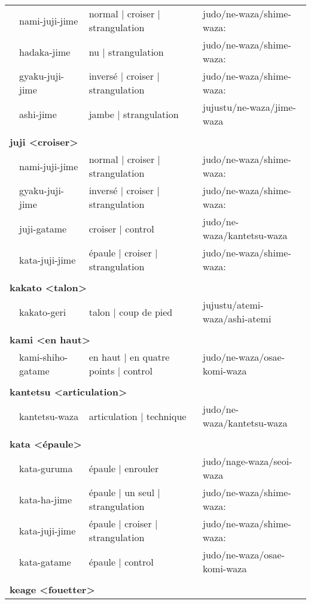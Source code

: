 \documentclass{article}%
\begin{document}
\begin{longtable}{rlll}
&nami{-}juji{-}jime&normal | croiser | strangulation&judo/ne{-}waza/shime{-}waza:\\%
&hadaka{-}jime&nu | strangulation&judo/ne{-}waza/shime{-}waza:\\%
&gyaku{-}juji{-}jime&inversé | croiser | strangulation&judo/ne{-}waza/shime{-}waza:\\%
&ashi{-}jime&jambe | strangulation&jujustu/ne{-}waza/jime{-}waza\\%
&&&\\%
\multicolumn{3}{l}{\textbf{juji <croiser>}%
~%
}&\\%
&nami{-}juji{-}jime&normal | croiser | strangulation&judo/ne{-}waza/shime{-}waza:\\%
&gyaku{-}juji{-}jime&inversé | croiser | strangulation&judo/ne{-}waza/shime{-}waza:\\%
&juji{-}gatame&croiser | control&judo/ne{-}waza/kantetsu{-}waza\\%
&kata{-}juji{-}jime&épaule | croiser | strangulation&judo/ne{-}waza/shime{-}waza:\\%
&&&\\%
\multicolumn{3}{l}{\textbf{kakato <talon>}%
~%
}&\\%
&kakato{-}geri&talon | coup de pied&jujustu/atemi{-}waza/ashi{-}atemi\\%
&&&\\%
\multicolumn{3}{l}{\textbf{kami <en haut>}%
~%
}&\\%
&kami{-}shiho{-}gatame&en haut | en quatre points | control&judo/ne{-}waza/osae{-}komi{-}waza\\%
&&&\\%
\multicolumn{3}{l}{\textbf{kantetsu <articulation>}%
~%
}&\\%
&kantetsu{-}waza&articulation | technique&judo/ne{-}waza/kantetsu{-}waza\\%
&&&\\%
\multicolumn{3}{l}{\textbf{kata <épaule>}%
~%
}&\\%
&kata{-}guruma&épaule | enrouler&judo/nage{-}waza/seoi{-}waza\\%
&kata{-}ha{-}jime&épaule | un seul | strangulation&judo/ne{-}waza/shime{-}waza:\\%
&kata{-}juji{-}jime&épaule | croiser | strangulation&judo/ne{-}waza/shime{-}waza:\\%
&kata{-}gatame&épaule | control&judo/ne{-}waza/osae{-}komi{-}waza\\%
&&&\\%
\multicolumn{3}{l}{\textbf{keage <fouetter>}%
~%
}&\\%

\end{longtable}
\end{document}
